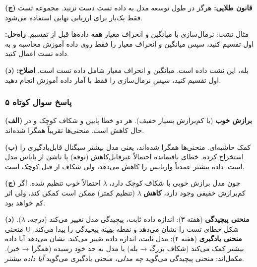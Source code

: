 \documentclass[12pt,a4paper]{article}
\begin{document}
\textbf{(ج)} \textbf{قانون طلایی:} هرگز در طول توسعه مدل به داده تست دست نزنید. مجموعه تست فقط یک‌بار برای ارزیابی نهایی استفاده می‌شود.

مثال نشت: نرمال‌سازی با میانگین و انحراف معیار \textbf{همه} داده‌ها قبل از تقسیم. \textbf{راه‌حل:} اول تقسیم کنید، سپس میانگین و انحراف معیار را فقط روی داده آموزش محاسبه و به داده تست اعمال کنید.

\textbf{(د)} بله، این نشت داده است. میانگین و انحراف معیار شامل داده تست است. \textbf{اصلاح:} اول تقسیم کنید، سپس نرمال‌سازی را فقط با آمار داده آموزش انجام دهید.

\bigskip

\subsubsection*{پاسخ سوال کوتاه ۵}

\textbf{(الف)} \textbf{برازش خوب} (یا کم‌برازش بسیار خفیف). هر دو خطا پایین و شکاف کوچک و در حال کاهش است. منحنی‌ها تقریباً همگرا شده‌اند.

\textbf{(ب)} کمک حاشیه‌ای. منحنی‌ها همگرا شده‌اند، یعنی مدل بیشتر سیگنال قابل‌یادگیری را استخراج کرده. خطای باقیمانده احتمالاً غیرقابل‌کاهش (نوفه) یا ناشی از بایاس مدل است. داده بیشتر عمدتاً واریانس را کاهش می‌دهد، ولی شکاف از قبل کوچک است.

\textbf{(ج)} چون مدل برازش خوبی با شکاف کوچک دارد، $\lambda$ احتمالاً خوب تنظیم شده. اگر کم‌برازش خفیفی وجود دارد، \textbf{کاهش} $\lambda$ (تنظیم کمتر) ممکن است کمکی کند، ولی اثر کم خواهد بود.

\textbf{(د)} \textbf{منحنی پیچیدگی} (هفته ۳): اندازه داده ثابت، پیچیدگی مدل تغییر می‌کند (درجه، $\lambda$). منحنی U شکل خطای تست را نشان می‌دهد و نقطه بهینه پیچیدگی را پیدا می‌کند. \textbf{منحنی یادگیری} (هفته ۴): مدل ثابت، اندازه داده تغییر می‌کند. نشان می‌دهد آیا داده بیشتر کمک می‌کند (شکاف بزرگ → بله) یا مدل به حد خود رسیده (همگرا → خیر). مکمل‌اند: منحنی پیچیدگی می‌گوید \textit{چه مدلی}، منحنی یادگیری می‌گوید \textit{آیا داده بیشتر}.
\end{document}
